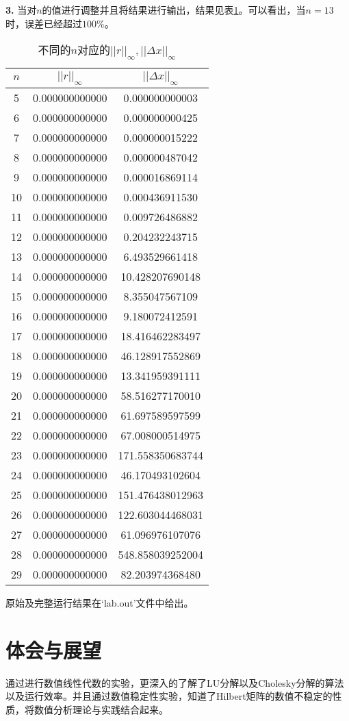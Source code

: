 \documentclass{article}
\theoremstyle{plain}
\theoremstyle{definition}
\theoremstyle{remark}
\begin{document}
\textbf{3.} 当对$n$的值进行调整并且将结果进行输出，结果见表\ref{p5res}。可以看出，当$n=13$时，误差已经超过$100\%$。

\begin{table}[!htbp]
    \centering
    \begin{tabular}{|c|c|c|}
    \hline
    \hline
    $n$ & $||r||_{\infty}$ & $||\Delta x||_{\infty}$ \\
    \hline
        5  & 0.000000000000 & 0.000000000003   \\
        6  & 0.000000000000 & 0.000000000425   \\
        7  & 0.000000000000 & 0.000000015222   \\
        8  & 0.000000000000 & 0.000000487042   \\
        9  & 0.000000000000 & 0.000016869114   \\
        10 & 0.000000000000 & 0.000436911530   \\
        11 & 0.000000000000 & 0.009726486882   \\
        12 & 0.000000000000 & 0.204232243715   \\
        13 & 0.000000000000 & 6.493529661418   \\
        14 & 0.000000000000 & 10.428207690148  \\
        15 & 0.000000000000 & 8.355047567109   \\
        16 & 0.000000000000 & 9.180072412591   \\
        17 & 0.000000000000 & 18.416462283497  \\
        18 & 0.000000000000 & 46.128917552869  \\
        19 & 0.000000000000 & 13.341959391111  \\
        20 & 0.000000000000 & 58.516277170010  \\
        21 & 0.000000000000 & 61.697589597599  \\
        22 & 0.000000000000 & 67.008000514975  \\
        23 & 0.000000000000 & 171.558350683744 \\
        24 & 0.000000000000 & 46.170493102604  \\
        25 & 0.000000000000 & 151.476438012963 \\
        26 & 0.000000000000 & 122.603044468031 \\
        27 & 0.000000000000 & 61.096976107076  \\
        28 & 0.000000000000 & 548.858039252004 \\
        29 & 0.000000000000 & 82.203974368480 \\ \hline\hline
    \end{tabular}
    \caption{不同的$n$对应的$||r||_{\infty},||\Delta x||_{\infty}$}
    \label{p5res}
\end{table}

原始及完整运行结果在`lab.out'文件中给出。
    
\section{体会与展望}
通过进行数值线性代数的实验，更深入的了解了LU分解以及Cholesky分解的算法以及运行效率。并且通过数值稳定性实验，知道了Hilbert矩阵的数值不稳定的性质，将数值分析理论与实践结合起来。
\end{document}
